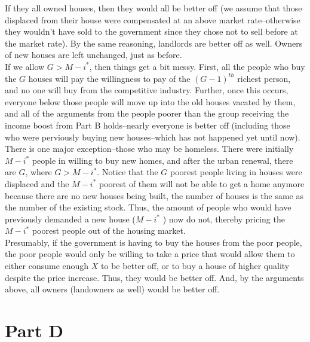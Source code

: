 \documentclass[12pt]{paper}
\begin{document}
If they all owned houses, then they would all be better off (we assume that those displaced from their house were compensated at an above market rate--otherwise they wouldn't have sold to the government since they chose not to sell before at the market rate). By the same reasoning, landlords are better off as well. Owners of new houses are left unchanged, just as before.\\


If we allow $G>M-i^*$, then things get a bit messy. First, all the people who buy the $G$ houses will pay the willingness to pay of the $(G-1)^{th}$ richest person, and no one will buy from the competitive industry. Further, once this occurs, everyone below those people will move up into the old houses vacated by them, and all of the arguments from the people poorer than the group receiving the income boost from Part B holds--nearly everyone is better off (including those who were perviously buying new houses--which has not happened yet until now). There is one major exception--those who may be homeless. There were initially $M-i^*$ people in willing to buy new homes, and after the urban renewal, there are $G$, where $G>M-i^*$. Notice that the $G$ poorest people living in houses were displaced and the $M-i^*$ poorest of them will not be able to get a home anymore because there are no new houses being built, the number of houses is the same as the number of the existing stock. Thus, the amount of people who would have previously demanded a new house ($M-i^*$ ) now do not, thereby pricing the $M-i^*$ poorest people out of the housing market.\\

Presumably, if the government is having to buy the houses from the poor people, the poor people would only be willing to take a price that would allow them to either consume enough $X$ to be better off, or to buy a house of higher quality despite the price increase. Thus, they would be better off. And, by the arguments above, all owners (landowners as well) would be better off.\\


\section*{Part D}
\end{document}
